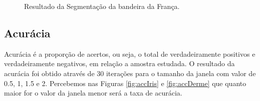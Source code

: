 \documentclass[preprint,12pt]{elsarticle}
\begin{document}
\begin{figure}[H]
	\centering
	
	
	\caption{Resultado da Segmentação da bandeira da França.}
	\label{fig:flagFrancen}
\end{figure}


\subsection{Acurácia}

Acurácia é a proporção de acertos, ou seja, o total de verdadeiramente positivos e verdadeiramente negativos, em relação a amostra estudada. O resultado da acurácia foi obtido através de 30 iterações para o tamanho da janela com valor de 0.5, 1, 1.5 e 2. Percebemos nas Figuras \ref{fig:accIris} e \ref{fig:accDerme} que quanto maior for o valor da janela menor será a taxa de acurácia.
\end{document}
